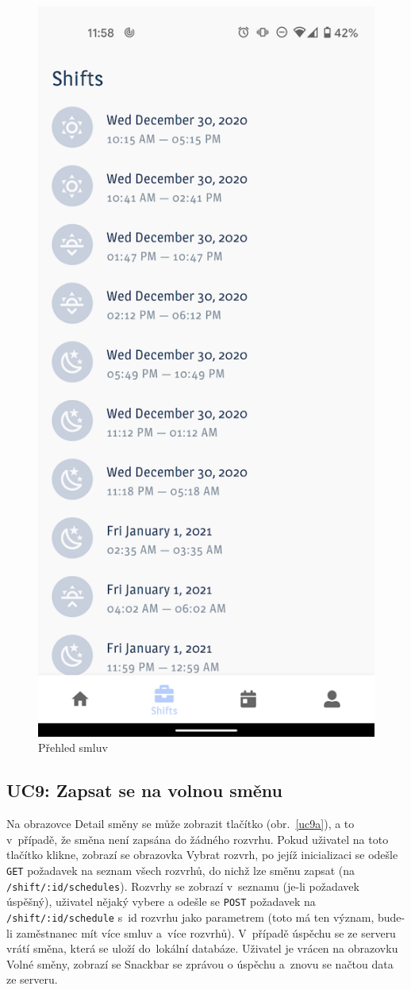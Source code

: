 \documentclass[twoside]{ctuthesis}
\begin{document}
\begin{figure}[ht]
	\includegraphics[width=.45\linewidth]{img/uc8.png}
	\caption{Přehled smluv}
	\label{uc8}
\end{figure}
\newpage


\subsection{UC9: Zapsat se na volnou směnu}

Na obrazovce Detail směny se může zobrazit tlačítko  (obr.~\ref{uc9a}), a to v~případě, že směna není zapsána do žádného rozvrhu. Pokud uživatel na toto tlačítko klikne, zobrazí se obrazovka Vybrat rozvrh, po jejíž inicializaci se odešle \texttt{GET} požadavek na seznam všech rozvrhů, do nichž lze směnu zapsat (na \texttt{/shift/:id/schedules}). Rozvrhy se zobrazí v~seznamu (je-li požadavek úspěšný), uživatel nějaký vybere a odešle se \texttt{POST} požadavek na \texttt{/shift/:id/schedule} s~id rozvrhu jako parametrem (toto má ten význam, bude-li zaměstnanec mít více smluv a~více rozvrhů). V~případě úspěchu se ze serveru vrátí směna, která se uloží do~lokální databáze. Uživatel je vrácen na obrazovku Volné směny, zobrazí se Snackbar se zprávou o úspěchu a~znovu se načtou data ze serveru.
\end{document}
